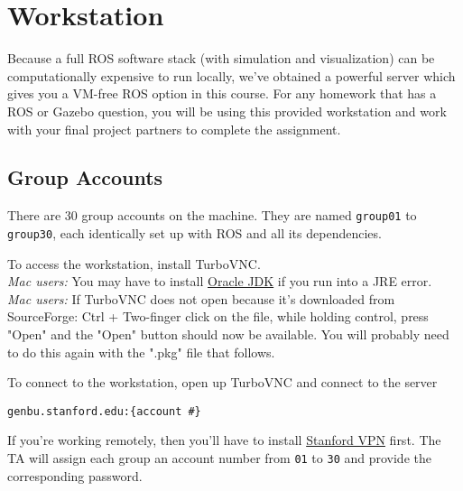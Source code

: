 \section{Workstation}
Because a full ROS software stack (with simulation and visualization) can be computationally expensive to run locally, we've obtained a powerful server which gives you a VM-free ROS option in this course. For any homework that has a ROS or Gazebo question, you will be using this provided workstation and work with your final project partners to complete the assignment.


\subsection*{Group Accounts}
There are 30 group accounts on the machine. They are named \texttt{group01} to \texttt{group30}, each identically set up with ROS and all its dependencies.

To access the workstation, install TurboVNC.\\
\emph{Mac users:} You may have to install \href{https://www.oracle.com/java/technologies/javase-jdk15-downloads.html}{Oracle JDK} if you run into a JRE error.\\
\emph{Mac users:} If TurboVNC does not open because it's downloaded from SourceForge:
Ctrl + Two-finger click on the file, while holding control, press "Open" and the "Open" button should now be available. You will probably need to do this again with the ".pkg" file that follows.


To connect to the workstation, open up TurboVNC and connect to the server
\begin{lstlisting}
genbu.stanford.edu:{account #}
\end{lstlisting}
If you're working remotely, then you'll have to install \href{https://uit.stanford.edu/service/vpn}{Stanford VPN} first.
The TA will assign each group an account number from \texttt{01} to \texttt{30} and provide the corresponding password.

